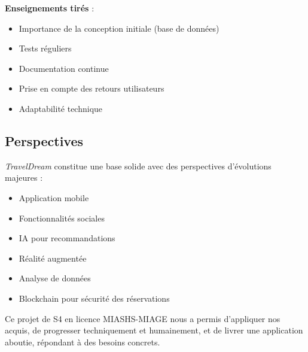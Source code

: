 \documentclass[a4paper,12pt]{article}
\begin{document}
\textbf{Enseignements tirés} :
\begin{itemize}
  \item Importance de la conception initiale (base de données)
  \item Tests réguliers
  \item Documentation continue
  \item Prise en compte des retours utilisateurs
  \item Adaptabilité technique
\end{itemize}

\subsection{Perspectives}
\textit{TravelDream} constitue une base solide avec des perspectives d’évolutions majeures :
\begin{itemize}
  \item Application mobile
  \item Fonctionnalités sociales
  \item IA pour recommandations
  \item Réalité augmentée
  \item Analyse de données
  \item Blockchain pour sécurité des réservations
\end{itemize}

Ce projet de S4 en licence MIASHS-MIAGE nous a permis d’appliquer nos acquis, de progresser techniquement et humainement, et de livrer une application aboutie, répondant à des besoins concrets.
\end{document}
